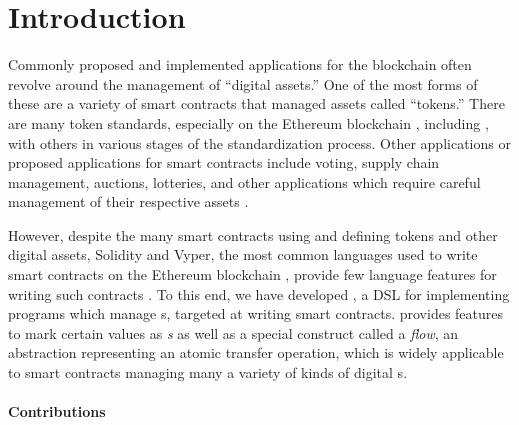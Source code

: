 \documentclass[dvipsnames, usenames, sigconf]{acmart}
\begin{document}

\maketitle


\section{Introduction}


Commonly proposed and implemented applications for the blockchain often revolve around the management of ``digital assets.'' 
One of the most forms of these are a variety of smart contracts that managed assets called ``tokens.''
There are many token standards, especially on the Ethereum blockchain , including , with others in various stages of the standardization process.
Other applications or proposed applications for smart contracts include voting, supply chain management, auctions, lotteries, and other applications which require careful management of their respective assets .

However, despite the many smart contracts using and defining tokens and other digital assets, Solidity  and Vyper, the most common languages used to write smart contracts on the Ethereum blockchain , provide few  language features for writing such contracts .
To this end, we have developed \langName, a DSL for implementing programs which manage \assetTxt{}s, targeted at writing smart contracts.
\langName provides features to mark certain values as \emph{\assetTxt{}s} as well as a special construct called a \emph{flow}, an abstraction representing an atomic transfer operation, which is widely applicable to smart contracts managing many a variety of kinds of digital \assetTxt{}s.

\paragraph{Contributions}
\end{document}
